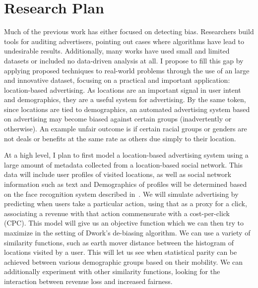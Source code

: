 


\section{Research Plan}
Much of the previous work has either focused on detecting bias.
Researchers build tools for auditing advertisers, pointing out cases where algorithms have lead to undesirable results.
Additionally, many works have used small and limited datasets or included no data-driven analysis at all.
I propose to fill this gap by applying proposed techniques to real-world problems through the use of an large and innovative dataset, focusing on a practical and important application: location-based advertising.
As locations are an important signal in user intent and demographics, they are a useful system for advertising.
By the same token, since locations are tied to demographics, an automated advertising system based on advertising may become biased against certain groups (inadvertently or otherwise). 
An example unfair outcome is if certain racial groups or genders are not deals or benefits at the same rate as others due simply to their location.

At a high level, I plan to first model a location-based advertising system using a large amount of metadata collected from a location-based social network.
This data will include user profiles of visited locations, as well as social network information such as text and 
Demographics of profiles will be determined based on the face recognition system described in~.
We will simulate advertising by predicting when users take a particular action, using that as a proxy for a click, associating a revenue with that action commensurate with a cost-per-click (CPC).
This model will give us an objective function which we can then try to maximize in the setting of Dwork's de-biasing algorithm.
We can use a variety of similarity functions, such as earth mover distance between the histogram of locations visited by a user.
This will let us see when statistical parity can be achieved between various demographic groups based on their mobility.
We can additionally experiment with other similarity functions, looking for the interaction between revenue loss and increased fairness.

